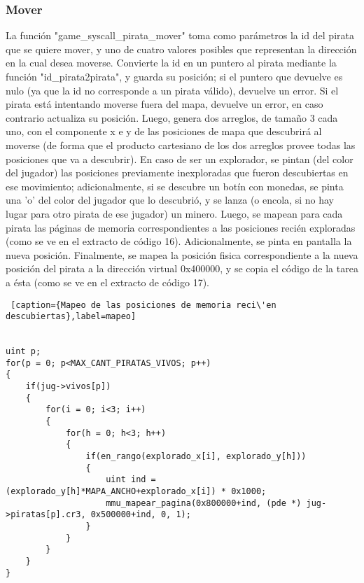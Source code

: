 \subsubsection*{Mover}
\par La funci\'on "game_syscall_pirata_mover" toma como par\'ametros la id del pirata que se quiere mover, y uno de cuatro valores posibles que representan la direcci\'on en la cual desea moverse. 
Convierte la id en un puntero al pirata mediante la funci\'on "id_pirata2pirata", y guarda su posici\'on; si el puntero que devuelve es nulo (ya que la id no corresponde a un pirata v\'alido), devuelve un error.
Si el pirata est\'a intentando moverse fuera del mapa, devuelve un error, en caso contrario actualiza su posici\'on.
Luego, genera dos arreglos, de tama\~no 3 cada uno, con el componente x e y de las posiciones de mapa que descubrir\'a al moverse (de forma que el producto cartesiano de los dos arreglos provee todas las posiciones que va a descubrir).
En caso de ser un explorador, se pintan (del color del jugador) las posiciones previamente inexploradas que fueron descubiertas en ese movimiento; adicionalmente, si se descubre un bot\'in con monedas, se pinta una 'o' del color del jugador que lo descubri\'o, y se lanza (o encola, si no hay lugar para otro pirata de ese jugador) un minero.
Luego, se mapean para cada pirata las p\'aginas de memoria correspondientes a las posiciones reci\'en exploradas (como se ve en el extracto de c\'odigo 16).
Adicionalmente, se pinta en pantalla la nueva posici\'on. Finalmente, se mapea la posici\'on fisica correspondiente a la nueva posici\'on del pirata a la direcci\'on virtual 0x400000, y se copia el c\'odigo de la tarea a \'esta (como se ve en el extracto de c\'odigo 17).



\begin{lstlisting} [caption={Mapeo de las posiciones de memoria reci\'en descubiertas},label=mapeo]


uint p;
for(p = 0; p<MAX_CANT_PIRATAS_VIVOS; p++)
{
    if(jug->vivos[p])
    {
        for(i = 0; i<3; i++)
        {
            for(h = 0; h<3; h++)
            {			
                if(en_rango(explorado_x[i], explorado_y[h]))
                {
                    uint ind = (explorado_y[h]*MAPA_ANCHO+explorado_x[i]) * 0x1000;
                    mmu_mapear_pagina(0x800000+ind, (pde *) jug->piratas[p].cr3, 0x500000+ind, 0, 1);
                }
            }
        }
    }
}

\end{lstlisting}


